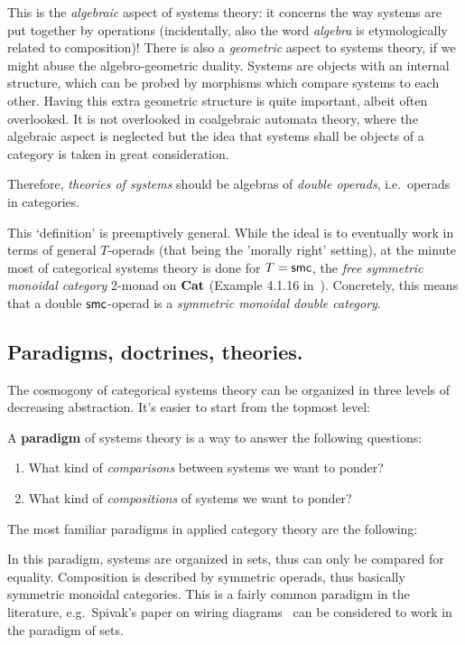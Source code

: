 This is the \emph{algebraic} aspect of systems theory: it concerns the way systems are put together by operations (incidentally, also the word \emph{algebra} is etymologically related to composition)!
There is also a \emph{geometric} aspect to systems theory, if we might abuse the algebro-geometric duality.
Systems are objects with an internal structure, which can be probed by morphisms which compare systems to each other.
Having this extra geometric structure is quite important, albeit often overlooked. It is not overlooked in coalgebraic automata theory, where the algebraic aspect is neglected but the idea that systems shall be objects of a category is taken in great consideration.

Therefore, \emph{theories of systems} should be algebras of \emph{double operads}, i.e.~operads in categories.

\begin{remark}
	This `definition' is preemptively general.
	While the ideal is to eventually work in terms of general $T$-operads (that being the 'morally right' setting), at the minute  most of categorical systems theory is done for $T = {\sf smc}$, the \emph{free symmetric monoidal category} 2-monad on $\Cat$ (Example 4.1.16 in~\cite{leinster_higher_2004}).
	Concretely, this means that a double ${\sf smc}$-operad is a \emph{symmetric monoidal double category}.
\end{remark}

\subsection{Paradigms, doctrines, theories.}
The cosmogony of categorical systems theory can be organized in three levels of decreasing abstraction.
It's easier to start from the topmost level:

\begin{definition}[Paradigm]
	A \textbf{paradigm} of systems theory is a way to answer the following questions:
	\begin{enumerate}
		\item What kind of \emph{comparisons} between systems we want to ponder?
		\item What kind of \emph{compositions} of systems we want to ponder?
	\end{enumerate}
\end{definition}

The most familiar paradigms in applied category theory are the following:

\begin{example}
	In this paradigm, systems are organized in sets, thus can only be compared for equality.
	Composition is described by symmetric operads, thus basically symmetric monoidal categories.
	This is a fairly common paradigm in the literature, e.g.~Spivak's paper on wiring diagrams~\cite{spivak2013operad} can be considered to work in the paradigm of sets.
\end{example}

